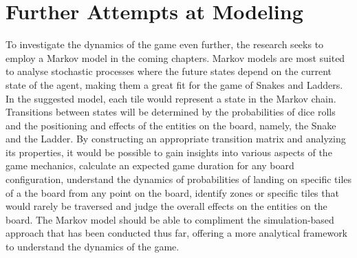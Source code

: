 \documentclass[12pt]{report}
\begin{document}
		\section{Further Attempts at Modeling}
	To investigate the dynamics of the game even further, the research seeks to employ a Markov model in the coming chapters. Markov models are most suited to analyse stochastic processes where the future states depend on the current state of the agent, making them a great fit for the game of Snakes and Ladders. In the suggested model, each tile would represent a state in the Markov chain. Transitions between states will be determined by the probabilities of dice rolls and the positioning and effects of the entities on the board, namely, the Snake and the Ladder. By constructing an appropriate transition matrix and analyzing its properties, it would be possible to gain insights into various aspects of the game mechanics, calculate an expected game duration for any board configuration, understand the dynamics of probabilities of landing on specific tiles of a the board from any point on the board, identify zones or specific tiles that would rarely be traversed and judge the overall effects on the entities on the board. The Markov model should be able to compliment the simulation-based approach that has been conducted thus far, offering a more analytical framework to understand the dynamics of the game.
	
\end{document}
